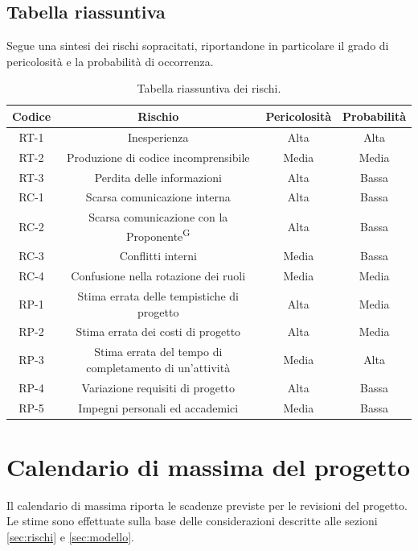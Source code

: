 \documentclass[8pt]{article}
\newcommand{\glossterm}[1]{#1\textsuperscript{G}} %
\begin{document}
\subsection{Tabella riassuntiva}
Segue una sintesi dei rischi sopracitati, riportandone in particolare il grado di pericolosità e la probabilità di occorrenza.
\begin{table}[ht!]
    \centering
    \renewcommand{\arraystretch}{1.25}
    \begin{tabular}{cccc}
        \toprule
        \textbf{Codice} & \textbf{Rischio} & \textbf{Pericolosità} & \textbf{Probabilità} \\ \midrule
        RT-1 & Inesperienza & Alta & Alta \\ 
        RT-2 & Produzione di codice incomprensibile & Media & Media \\ 
        RT-3 & Perdita delle informazioni & Alta & Bassa \\ 
        RC-1 & Scarsa comunicazione interna & Alta & Bassa \\ 
        RC-2 & Scarsa comunicazione con la \glossterm{Proponente} & Alta & Bassa \\ 
        RC-3 & Conflitti interni & Media & Bassa \\ 
        RC-4 & Confusione nella rotazione dei ruoli & Media & Media \\ 
        RP-1 & Stima errata delle tempistiche di progetto & Alta & Media \\ 
        RP-2 & Stima errata dei costi di progetto & Alta & Media \\ 
        RP-3 & Stima errata del tempo di completamento di un'attività & Media & Alta \\ 
        RP-4 & Variazione requisiti di progetto & Alta & Bassa \\ 
        RP-5 & Impegni personali ed accademici & Media & Bassa \\ 
        \bottomrule
    \end{tabular}
    \caption{Tabella riassuntiva dei rischi.}
    \label{table:Tabella riassuntiva dei rischi}
\end{table}
\newpage
\section{Calendario di massima del progetto} \label{sec:calendar}
Il calendario di massima riporta le scadenze previste per le revisioni del progetto. Le stime sono effettuate sulla base delle considerazioni descritte alle sezioni \ref{sec:rischi} e \ref{sec:modello}.
\end{document}
